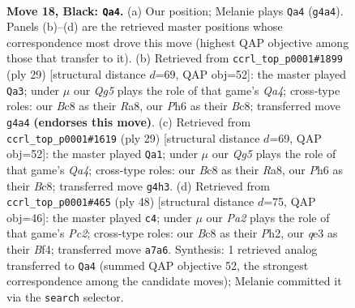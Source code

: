 \documentclass[11pt]{article}
\begin{document}
\clearpage

\begin{figure}[p]\centering
\begin{subfigure}{0.46\textwidth}\centering
\resizebox{\linewidth}{!}{%
\newchessgame
\chessboard[
  setfen={1rb1k2r/p1pp1pp1/2p4p/4P3/6q1/P3Q3/P1P1B3/R2KR3 b k - 7 18},
  showmover=false,
  pgfstyle=straightmove, color=movearrow, markmove={g4-a4}
]}
\caption{}
\end{subfigure}\hfill
\begin{subfigure}{0.46\textwidth}\centering
\resizebox{\linewidth}{!}{%
\newchessgame
\chessboard[
  setfen={r1b2rk1/pp2pp1p/6p1/q2P4/2B1P3/8/1bRB1PPP/3QK2R b K - 3 15},
  showmover=false,
  pgfstyle=straightmove, color=movearrow, markmove={a5-a3}
]}
\caption{}
\end{subfigure}
\\[4pt]
\begin{subfigure}{0.46\textwidth}\centering
\resizebox{\linewidth}{!}{%
\newchessgame
\chessboard[
  setfen={r1b2rk1/pp2pp1p/6p1/q2P4/2B1P3/8/1bRB1PPP/3QK2R b K - 3 15},
  showmover=false,
  pgfstyle=straightmove, color=movearrow, markmove={a5-a1}
]}
\caption{}
\end{subfigure}\hfill
\begin{subfigure}{0.46\textwidth}\centering
\resizebox{\linewidth}{!}{%
\newchessgame
\chessboard[
  setfen={1n4kr/p4qp1/3P3p/3Q1b2/5B2/P4P2/1PP3PP/R5K1 w - - 1 25},
  showmover=false,
  pgfstyle=straightmove, color=movearrow, markmove={c2-c4}
]}
\caption{}
\end{subfigure}
\caption{\textbf{Move 18, Black: \texttt{Qa4}.} (a) Our position; Melanie plays \texttt{Qa4} (\texttt{g4a4}). Panels (b)--(d) are the retrieved master positions whose correspondence most drove this move (highest QAP objective among those that transfer to it). (b) Retrieved from \texttt{ccrl\_top\_p0001\#1899} (ply 29) [structural distance $d$=69, QAP obj=52]: the master played \texttt{Qa3}; under $\mu$ our \emph{Qg5} plays the role of that game's \emph{Qa4}; cross-type roles: our \emph{B}c8 as their \emph{R}a8, our \emph{P}h6 as their \emph{B}c8; transferred move \texttt{g4a4} \textbf{(endorses this move)}. (c) Retrieved from \texttt{ccrl\_top\_p0001\#1619} (ply 29) [structural distance $d$=69, QAP obj=52]: the master played \texttt{Qa1}; under $\mu$ our \emph{Qg5} plays the role of that game's \emph{Qa4}; cross-type roles: our \emph{B}c8 as their \emph{R}a8, our \emph{P}h6 as their \emph{B}c8; transferred move \texttt{g4h3}. (d) Retrieved from \texttt{ccrl\_top\_p0001\#465} (ply 48) [structural distance $d$=75, QAP obj=46]: the master played \texttt{c4}; under $\mu$ our \emph{Pa2} plays the role of that game's \emph{Pc2}; cross-type roles: our \emph{B}c8 as their \emph{P}h2, our \emph{q}e3 as their \emph{B}f4; transferred move \texttt{a7a6}. Synthesis: 1 retrieved analog transferred to \texttt{Qa4} (summed QAP objective 52, the strongest correspondence among the candidate moves); Melanie committed it via the \texttt{search} selector.}
\label{fig:thought-m35}
\end{figure}
\end{document}
